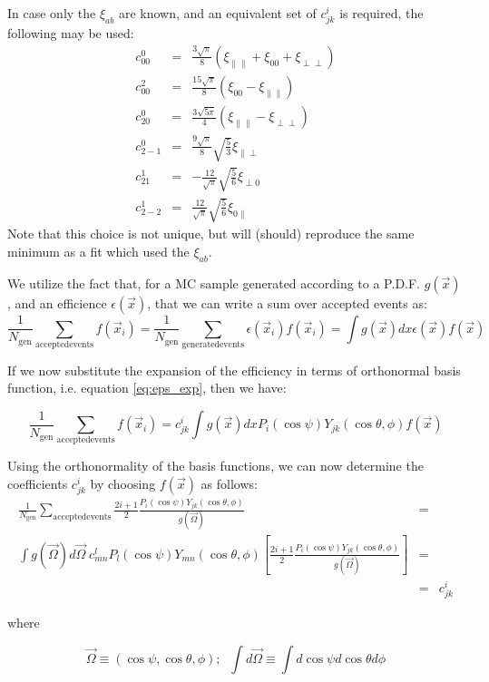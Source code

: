 \documentclass[a4paper,9pt,twoside]{article}
\begin{document}
In case only the $\xi_{ab}$ are known, and an equivalent set of $c^i_{jk}$ is required, the 
following may be used:
\begin{eqnarray}
 c^0_{00}  &=& \frac{3\sqrt{\pi}}{8}( \xi_{\parallel \parallel }+\xi_{00}+\xi_{\perp\perp} )     \\
 c^2_{00}  &=& \frac{15\sqrt{\pi}}{8}( \xi_{00} - \xi_{\parallel \parallel } )    \\
 c^0_{20}  &=& \frac{3\sqrt{5\pi}}{4} ( \xi_{\parallel \parallel } - \xi_{\perp\perp} )    \\
 c^0_{2-1} &=& \frac{9\sqrt{\pi}}{8}\sqrt{\frac{5}{3}}  \xi_{\parallel \perp}    \\
 c^1_{21}  &=& - \frac{12}{\sqrt{\pi}}\sqrt{\frac{5}{6}} \xi_{\perp0}    \\
 c^1_{2-2} &=&   \frac{12}{\sqrt{\pi}}\sqrt{\frac{5}{6}}  \xi_{0\parallel }
\end{eqnarray}
Note that this choice is not unique, but will (should)  reproduce the same minimum as a fit which used
the $\xi_{ab}$.




We utilize the fact that, for a MC sample generated according to a P.D.F. $g(\vec{x})$,
and an efficience $\epsilon(\vec{x})$, that we can write a sum over accepted events as:
\begin{equation}
  \frac{1}{N_{\mathrm{gen}}} \sum_{\mathrm{accepted events}} f(\vec{x}_i) = \frac{1}{N_{\mathrm{gen}}} \sum_{\mathrm{generated events}} \epsilon(\vec{x}_i) f(\vec{x}_i) =  \int g(\vec{x})dx \epsilon(\vec{x}) f(\vec{x})
\end{equation}

If we now substitute the expansion of the efficiency in terms of orthonormal basis function,
i.e. equation \ref{eq:eps_exp}, then we have:

\begin{equation}
  \frac{1}{N_{\mathrm{gen}}} \sum_{\mathrm{accepted events}} f(\vec{x}_i) = c^i_{jk}  \int g(\vec{x})dx P_i(\cos\psi)Y_{jk}(\cos\theta,\phi)  f(\vec{x})
\end{equation}

Using the orthonormality of the basis functions, we can now determine the coefficients $c^i_{jk}$ 
by  choosing $f(\vec{x})$ as follows:
\begin{eqnarray}
\frac{1}{N_{\mathrm{gen}}} \sum_{\mathrm{accepted events}} \frac{2i+1}{2}\frac{ P_i(\cos\psi)Y_{jk}(\cos\theta,\phi) }{ g(\vec{\Omega}) }  &=&\\
    \int g(\vec{\Omega})d\vec{\Omega}\; c^l_{mn} P_l(\cos\psi)Y_{mn}(\cos\theta,\phi) \left[  \frac{2i+1}{2}\frac{ P_i(\cos\psi)Y_{jk}(\cos\theta,\phi) }{ g(\vec{\Omega}) } \right] &=&\\
    &=& c^i_{jk}
\end{eqnarray}

where

\begin{equation}
\vec{\Omega} \equiv (\cos\psi,\cos\theta,\phi);\;\; \int d\vec{\Omega} \equiv \int d\cos\psi d\cos\theta d\phi
\end{equation}
\end{document}
